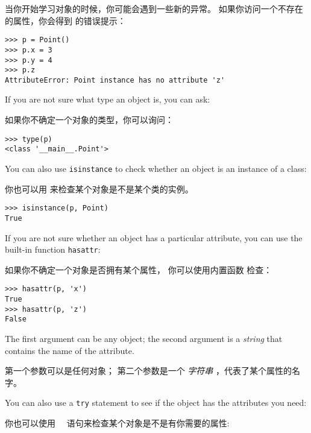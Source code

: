 当你开始学习对象的时候，你可能会遇到一些新的异常。
如果你访问一个不存在的属性，你会得到  的错误提示：

  

\begin{lstlisting}
>>> p = Point()
>>> p.x = 3
>>> p.y = 4
>>> p.z
AttributeError: Point instance has no attribute 'z'
\end{lstlisting}

%
If you are not sure what type an object is, you can ask:

如果你不确定一个对象的类型，你可以询问：

  

\begin{lstlisting}
>>> type(p)
<class '__main__.Point'>
\end{lstlisting}

%
You can also use {\tt isinstance} to check whether an object
is an instance of a class:

你也可以用  来检查某个对象是不是某个类的实例。

  

\begin{lstlisting}
>>> isinstance(p, Point)
True
\end{lstlisting}

%
If you are not sure whether an object has a particular attribute,
you can use the built-in function {\tt hasattr}:

如果你不确定一个对象是否拥有某个属性， 你可以使用内置函数  检查：
  

\begin{lstlisting}
>>> hasattr(p, 'x')
True
>>> hasattr(p, 'z')
False
\end{lstlisting}
%
The first argument can be any object; the second argument is a {\em
string} that contains the name of the attribute.

第一个参数可以是任何对象；
第二个参数是一个 {\em 字符串} ，代表了某个属性的名字。


You can also use a {\tt try} statement to see if the object has the
attributes you need:

你也可以使用 　语句来检查某个对象是不是有你需要的属性:

  

